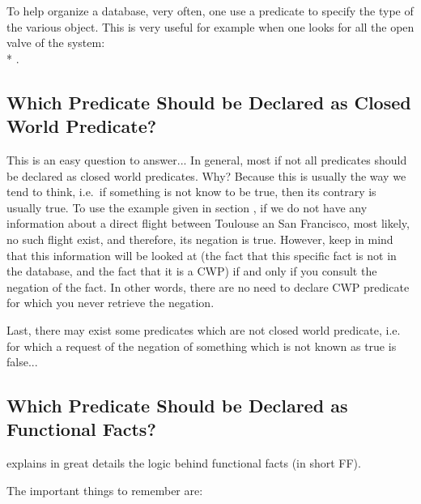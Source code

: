 To help organize a database, very often, one use a  predicate
to specify the type of the various object. This is very useful for
example when one looks for all the open valve of the system: \\*
.

\subsection{Which Predicate Should be Declared as Closed World Predicate?}

This is an easy question to answer... In general, most if not all
predicates should be declared as closed world predicates. Why? Because
this is usually the way we tend to think, i.e.\ if something is not know
to be true, then its contrary is usually true. To use the example given
in section , if we do not have any
information about a direct flight between Toulouse an San Francisco, most
likely, no such flight exist, and therefore, its negation is true.
However, keep in mind that this information will be looked at (the fact
that this specific fact is not in the database, and the fact that it is a
CWP) if and only if you consult the negation of the fact. In other words,
there are no need to declare CWP predicate for which you never retrieve
the negation.

Last, there may exist some predicates which are not closed world
predicate, i.e.
for which a request of the negation of something which is not known as
true is false...

\subsection{Which Predicate Should be Declared as Functional Facts?}

 explains in great details the logic
behind functional facts (in short FF).

The important things to remember are:

